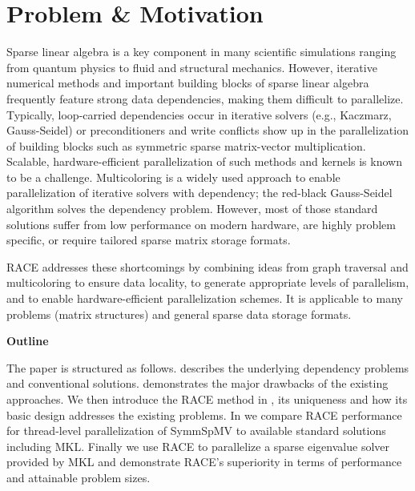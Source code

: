 	
\section{Problem \& Motivation}
	Sparse linear algebra is a key component in many scientific simulations
	ranging from quantum physics to fluid and structural mechanics.
	However, iterative numerical methods  
	and important building blocks of sparse linear algebra frequently feature strong 
	data dependencies, making them difficult to parallelize.
	Typically, loop-carried dependencies occur in
	iterative solvers  (e.g., Kaczmarz, Gauss-Seidel) or preconditioners 
	and write conflicts show up in the parallelization of building blocks such 
	as symmetric sparse matrix-vector multiplication.
	Scalable, hardware-efficient parallelization of such methods and kernels is known to be a 
	challenge. Multicoloring is a widely used approach to enable parallelization
	of iterative solvers with \DK dependency; \eg the 
	red-black Gauss-Seidel algorithm solves the \DONE dependency problem.
	However, most of those standard solutions suffer from low performance
	on modern hardware, are highly problem specific, or require tailored
        sparse matrix storage formats.

	\Acrshort{RACE} addresses these shortcomings by combining ideas from graph traversal
	and multicoloring to ensure data locality, to generate appropriate levels of parallelism,
	and to enable hardware-efficient parallelization schemes. It is applicable
	to many problems (\ie matrix structures) and general sparse data storage formats.
	

\noindent\textbf{Outline}


\noindent	The paper is structured as follows.  describes
	the underlying dependency problems and conventional
	solutions.  
	demonstrates the major drawbacks of the existing 
	approaches. We then introduce the \acrshort{RACE} method in ,
	its uniqueness and how its basic design addresses the existing problems. 
	In  we compare \acrshort{RACE} performance for thread-level parallelization of \acrfull{SymmSpMV} to
	available standard solutions including \acrshort{MKL}. Finally we use \acrshort{RACE} to parallelize a sparse eigenvalue solver provided by \acrshort{MKL} and demonstrate  \acrshort{RACE}'s superiority in terms of performance and attainable problem sizes. 
		

